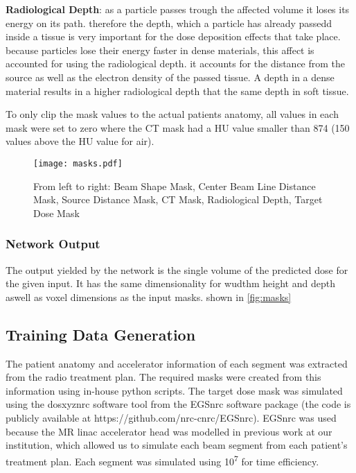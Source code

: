 \begin{hangingpar}
    \item \textbf{Radiological Depth}: as a particle passes trough the affected volume it loses its energy on its path. therefore the depth, which a particle has already passedd inside a tissue is very important for the dose deposition effects that take place. because particles lose their energy faster in dense materials, this affect is accounted for using the radiological depth. it accounts for the distance from the source as well as the electron density of the passed tissue. A depth in a dense material results in a higher radiological depth that the same depth in soft tissue.
\end{hangingpar}

To only clip the mask values to the actual patients anatomy, all values in each mask were set to zero where the CT mask had a HU value smaller than 874 (150 values above the HU value for air).

\begin{figure}
    \centering
    \texttt{[image: masks.pdf]}
    \caption{From left to right: Beam Shape Mask, Center Beam Line Distance Mask, Source Distance Mask, CT Mask, Radiological Depth, Target Dose Mask}
    \label{fig:masks}
\end{figure}

\subsubsection{Network Output}

The output yielded by the network is the single volume of the predicted dose for the given input. It has the same dimensionality for wudthm height and depth aswell as voxel dimensions as the input masks. shown in \autoref{fig:masks}

\subsection{Training Data Generation}

The patient anatomy and accelerator information of each segment was extracted from the radio treatment plan. The required masks were created from this information using in-house python scripts. The target dose mask was simulated using the dosxyznrc software tool from the EGSnrc software package (the code is publicly available at https://github.com/nrc-cnrc/EGSnrc). EGSnrc was used because the MR linac accelerator head was modelled in previous work at our institution, which allowed us to simulate each beam segment from each patient's treatment plan. Each segment was simulated using 10\textsuperscript{7} for time efficiency. 


